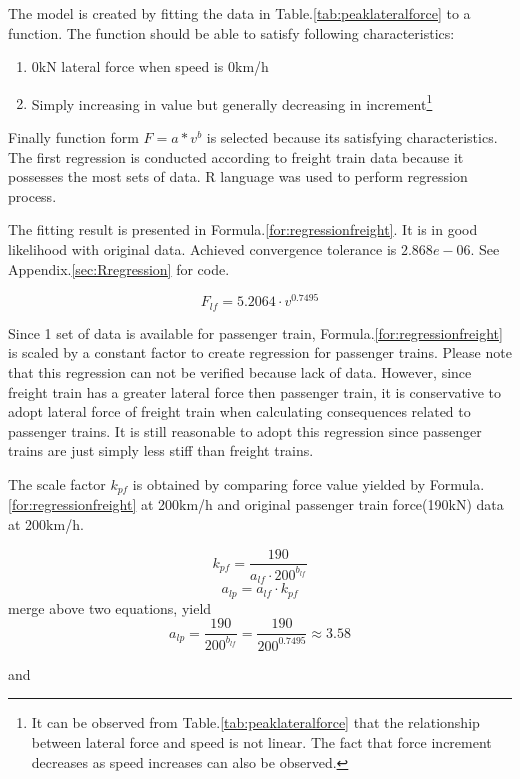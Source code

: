 The model is created by fitting the data in Table.\ref{tab:peaklateralforce} to a function. The function should be able to satisfy following characteristics:

\begin{enumerate}
	\item 0kN lateral force when speed is 0km/h
	\item Simply increasing in value but generally decreasing in increment\footnote{It can be observed from Table.\ref{tab:peaklateralforce}  that the relationship between lateral force and speed is not linear. The fact that force increment decreases as speed increases can also be observed.}
\end{enumerate}

Finally function form $F=a*v^b$ is selected because its satisfying characteristics. The first regression is conducted according to freight train data because it possesses the most sets of data. R language was used to perform regression process. 

The fitting result is presented in Formula.\ref{for:regressionfreight}. It is in good likelihood with original data. Achieved convergence tolerance is $2.868e-06$.  See Appendix.\ref{sec:Rregression} for code.

\begin{equation}
\label{for:regressionfreight}
F_{lf} = 5.2064\cdot v^{0.7495}
\end{equation}

Since 1 set of data is available for passenger train, Formula.\ref{for:regressionfreight} is scaled by a constant factor to create regression for passenger trains. Please note that this regression can not be verified because lack of data. However, since freight train has a greater lateral force then passenger train, it is conservative to adopt lateral force of freight train when calculating consequences related to passenger trains. It is still reasonable to adopt this regression since passenger trains are just simply less stiff than freight trains. 

The scale factor $k_{pf}$ is obtained by comparing force value yielded by Formula.\ref{for:regressionfreight} at 200km/h and original passenger train force(190kN) data at 200km/h.

$$k_{pf} = \frac{190}{a_{lf}\cdot 200^{b_{lf}}}$$
$$a_{lp} = a_{lf}\cdot k_{pf}$$
merge above two equations, yield
$$a_{lp} = \frac{190}{200^{b_{lf}}} = \frac{190}{200^{0.7495}} \approx 3.58$$

and 

